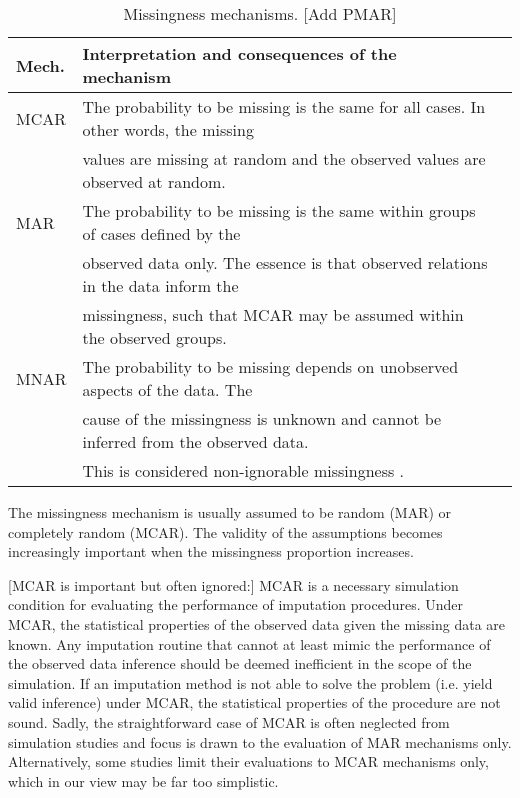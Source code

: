 \documentclass[bimj,fleqn]{w-art}
\begin{document}
\begin{table}[htb]
\begin{center}
\caption{Missingness mechanisms. [Add PMAR]}
\label{table:mech}
\begin{tabular}{lll}
\hline
Mech. & Interpretation and consequences of the mechanism \\
\hline  
MCAR  & The probability to be missing is the same for all cases. In other words, the missing \\
      & values are missing at random and the observed values are observed at random. \\
MAR   & The probability to be missing is the same within groups of cases defined by the \\
      & observed data only. The essence is that observed relations in the data inform the \\
      & missingness, such that MCAR may be assumed within the observed groups. \\
MNAR  & The probability to be missing depends on unobserved aspects of the data. The \\
      & cause of the missingness is unknown and cannot be inferred from the observed data. \\
      & This is considered non-ignorable missingness \citep[see e.g.][]{rubi76}. \\
\hline
\end{tabular}
\end{center}
\end{table}

The missingness mechanism is usually assumed to be random (MAR) or completely random (MCAR). The validity of the assumptions becomes increasingly important when the missingness proportion increases. 

[MCAR is important but often ignored:] MCAR is a necessary simulation condition for evaluating the performance of imputation procedures. Under MCAR, the statistical properties of the observed data given the missing data are known. Any imputation routine that cannot at least mimic the performance of the observed data inference should be deemed inefficient in the scope of the simulation. If an imputation method is not able to solve the problem (i.e. yield valid inference) under MCAR, the statistical properties of the procedure are not sound. Sadly, the straightforward case of MCAR is often neglected from simulation studies and focus is drawn to the evaluation of MAR mechanisms only. Alternatively, some studies limit their evaluations to MCAR mechanisms only, which in our view may be far too simplistic. 
\end{document}
